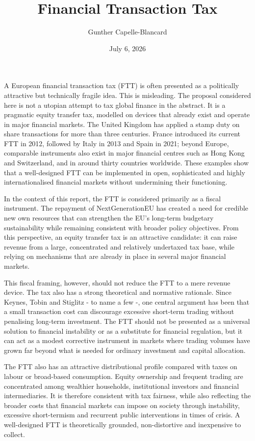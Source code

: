 \documentclass[../../main]{subfiles}
\begin{document}
\title{Financial Transaction Tax}
\author{Gunther Capelle-Blancard}
\date{July 6, 2026}
\maketitle


A European financial transaction tax (FTT) is often presented as a politically attractive but technically fragile idea. This is misleading. The proposal considered here is not a utopian attempt to tax global finance in the abstract. It is a pragmatic equity transfer tax, modelled on devices that already exist and operate in major financial markets. The United Kingdom has applied a stamp duty on share transactions for more than three centuries. France introduced its current FTT in 2012, followed by Italy in 2013 and Spain in 2021; beyond Europe, comparable instruments also exist in major financial centres such as Hong Kong and Switzerland, and in around thirty countries worldwide. These examples show that a well-designed FTT can be implemented in open, sophisticated and highly internationalised financial markets without undermining their functioning.

In the context of this report, the FTT is considered primarily as a fiscal instrument. The repayment of NextGenerationEU has created a need for credible new own resources that can strengthen the EU's long-term budgetary sustainability while remaining consistent with broader policy objectives. From this perspective, an equity transfer tax is an attractive candidate: it can raise revenue from a large, concentrated and relatively undertaxed tax base, while relying on mechanisms that are already in place in several major financial markets.

This fiscal framing, however, should not reduce the FTT to a mere revenue device. The tax also has a strong theoretical and normative rationale. Since Keynes, Tobin and Stiglitz - to name a few -, one central argument has been that a small transaction cost can discourage excessive short-term trading without penalising long-term investment. The FTT should not be presented as a universal solution to financial instability or as a substitute for financial regulation, but it can act as a modest corrective instrument in markets where trading volumes have grown far beyond what is needed for ordinary investment and capital allocation.

The FTT also has an attractive distributional profile compared with taxes on labour or broad-based consumption. Equity ownership and frequent trading are concentrated among wealthier households, institutional investors and financial intermediaries. It is therefore consistent with tax fairness, while also reflecting the broader costs that financial markets can impose on society through instability, excessive short-termism and recurrent public interventions in times of crisis. A well-designed FTT is theoretically grounded, non-distortive and inexpensive to collect.
\end{document}
